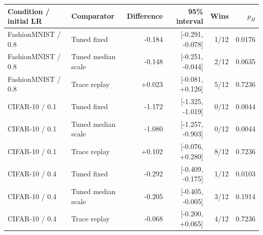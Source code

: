 \begin{tabular}{llrrrr}
\toprule
Condition / initial LR & Comparator & Difference & 95\% interval & Wins & $p_H$ \\
\midrule
FashionMNIST / 0.8 & Tuned fixed & -0.184 & [-0.291, -0.078] & 1/12 & 0.0176 \\
FashionMNIST / 0.8 & Tuned median scale & -0.148 & [-0.251, -0.044] & 2/12 & 0.0635 \\
FashionMNIST / 0.8 & Trace replay & +0.023 & [-0.081, +0.126] & 5/12 & 0.7236 \\
CIFAR-10 / 0.1 & Tuned fixed & -1.172 & [-1.325, -1.019] & 0/12 & 0.0044 \\
CIFAR-10 / 0.1 & Tuned median scale & -1.080 & [-1.257, -0.903] & 0/12 & 0.0044 \\
CIFAR-10 / 0.1 & Trace replay & +0.102 & [-0.076, +0.280] & 8/12 & 0.7236 \\
CIFAR-10 / 0.4 & Tuned fixed & -0.292 & [-0.409, -0.175] & 1/12 & 0.0103 \\
CIFAR-10 / 0.4 & Tuned median scale & -0.205 & [-0.405, -0.005] & 3/12 & 0.1914 \\
CIFAR-10 / 0.4 & Trace replay & -0.068 & [-0.200, +0.065] & 4/12 & 0.7236 \\
\bottomrule
\end{tabular}
